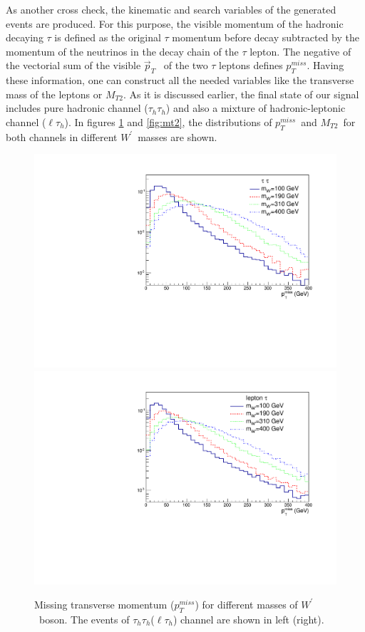 \documentclass[preprint,showpacs,preprintnumbers]{revtex4}
\newcommand{\wprime}{\ensuremath{W^\prime}~}
\newcommand{\tauTau}{\ensuremath{\tau_h\tau_h}}
\newcommand{\lepTau}{\ensuremath{\ell\tau_h}}
\newcommand{\mttwo}{\ensuremath{M_{T2}}}
\newcommand{\MET}{\ensuremath{p_T^{miss}}}
\begin{document}
As another cross check, the kinematic  and search  variables of the generated events are produced. 
For this purpose, the visible momentum of the hadronic decaying $\tau$ is defined as the original $\tau$ momentum before decay subtracted by the momentum of the neutrinos in the decay chain of the $\tau$ lepton. The negative of the vectorial sum of the visible $\vec{p}_T$ ~of the two $\tau$ leptons defines \MET. Having these information, one can construct all the needed variables like the transverse mass of the leptons or \mttwo. 
As it is discussed earlier, the final state of our signal includes pure hadronic channel (\tauTau) and also a mixture of hadronic-leptonic channel (\lepTau ).  In figures \ref{fig:met} and \ref{fig:mt2}, the distributions of \MET ~and \mttwo ~for both channels in different \wprime masses are shown.
\begin{figure}[htb]
	\centering
	\includegraphics*[width=.45\textwidth]{MET_hh.pdf}
	\hspace{3mm}
	\includegraphics*[width=.45\textwidth]{MET_lh.pdf}
	\caption{Missing transverse momentum (\MET) for different masses of \wprime boson. The events of \tauTau(\lepTau) channel are shown in left (right).}
	\label{fig:met}
\end{figure}
\end{document}

